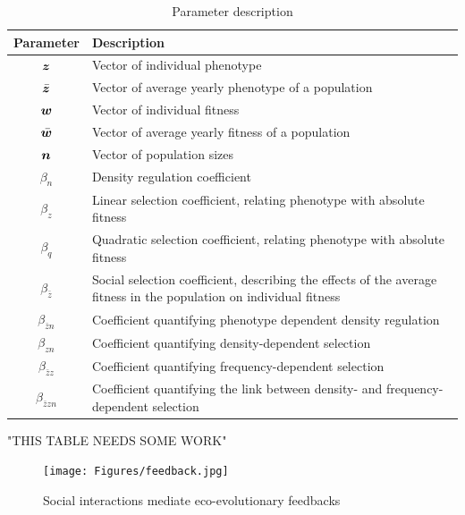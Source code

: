 \documentclass{article}
\begin{document}
\newpage
\begin{table}
	\begin{singlespace}
		\begin{tabular}{|c|p{12cm}|} 
			\hline
			
			Parameter & Description \\ 
			\hline
			$\vectorsym{z}$        & Vector of individual phenotype \\ 
			$\bar{\vectorsym{z}}$  & Vector of average yearly phenotype of a population\\ 
			$\vectorsym{w}$        & Vector of individual fitness \\ 
			$\bar{\vectorsym{w}}$  & Vector of average yearly fitness of a population\\ 
			$\vectorsym{n}$        & Vector of population sizes \\ 
			$\beta_n$              & Density regulation coefficient \\ 
			$\beta_z$              & Linear selection coefficient, relating phenotype with absolute fitness \\ 
			$\beta_q$              & Quadratic selection coefficient, relating phenotype with absolute fitness \\ 
			$\beta_{\bar{z}}$      & Social selection coefficient, describing the effects of the average fitness in the population on individual fitness \\ 
			$\beta_{\bar{z}n}$     & Coefficient quantifying phenotype dependent density regulation \\ 
			$\beta_{zn}$           & Coefficient quantifying density-dependent selection \\ 
			$\beta_{\bar{z}z}$     & Coefficient quantifying frequency-dependent selection \\ 
			$\beta_{\bar{z}zn}$    & Coefficient quantifying the link between density- and frequency-dependent selection\\ 
			\hline
		\end{tabular}
		\caption{Parameter description  }
	\end{singlespace}
\end{table}

"THIS TABLE NEEDS SOME WORK"

  
\begin{figure}[ht]
	\centering
	\texttt{[image: Figures/feedback.jpg]}
	\caption{Social interactions mediate eco-evolutionary feedbacks}
\end{figure}
\end{document}
